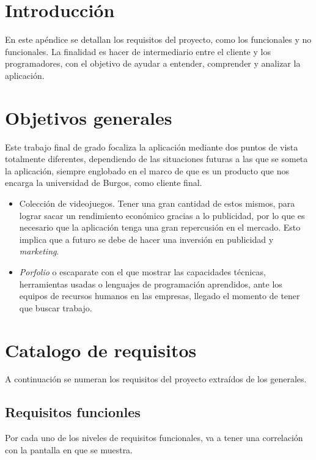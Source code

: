 
\section{Introducción}
En este apéndice se detallan los requisitos del proyecto, como los funcionales y no funcionales. La finalidad es hacer de intermediario entre el cliente y los programadores, con el objetivo de ayudar a entender, comprender y analizar la aplicación. 

\section{Objetivos generales}
Este trabajo final de grado focaliza la aplicación mediante dos puntos de vista totalmente diferentes, dependiendo de las situaciones futuras a las que se someta la aplicación, siempre englobado en el marco de que es un producto que nos encarga la universidad de Burgos, como cliente final.

\begin{itemize}
	\item Colección de videojuegos. Tener una gran cantidad de estos mismos, para lograr sacar un rendimiento económico gracias a lo publicidad, por lo que es necesario que la aplicación tenga una gran repercusión en el mercado. Esto implica que a futuro se debe de hacer una inversión en publicidad y \emph{marketing}.
	\item \emph{Porfolio} \cite{wiki:portafolio} o escaparate con el que mostrar las capacidades técnicas, herramientas usadas o lenguajes de programación aprendidos, ante los equipos de recursos humanos en las empresas, llegado el momento de tener que buscar trabajo. 
\end{itemize}

\section{Catalogo de requisitos}
A continuación se numeran los requisitos del proyecto extraídos de los generales.

\subsection{Requisitos funcionles}
Por cada uno de los niveles de requisitos funcionales, va a tener una correlación con la pantalla en que se muestra.

